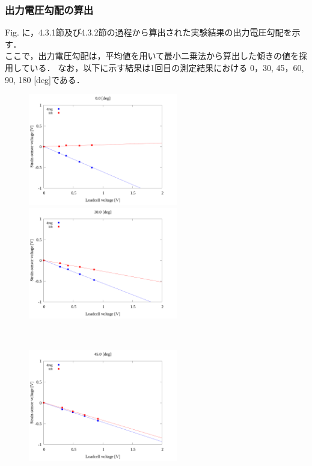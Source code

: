 \newpage

\subsubsection{出力電圧勾配の算出}

Fig. に，4.3.1節及び4.3.2節の過程から算出された実験結果の出力電圧勾配を示す．\\
ここで，出力電圧勾配は，平均値を用いて最小二乗法から算出した傾きの値を採用している．
なお，以下に示す結果は1回目の測定結果における 0，30, 45，60, 90, 180 [deg]である．

\begin{figure}[htbp]
  \begin{minipage}[b]{0.45\linewidth}
    \centering
    \includegraphics[width=65mm]{../../02_workspace/result/2-1/plot/04/04_linear_0.png}
  \end{minipage}
  \begin{minipage}[b]{0.45\linewidth}
    \centering
    \includegraphics[width=65mm]{../../02_workspace/result/2-1/plot/04/04_linear_300.png}
  \end{minipage} \\
  \begin{minipage}[b]{0.45\linewidth}
    \centering
    \includegraphics[width=65mm]{../../02_workspace/result/2-1/plot/04/04_linear_450.png}

\end{minipage}
\end{figure}
